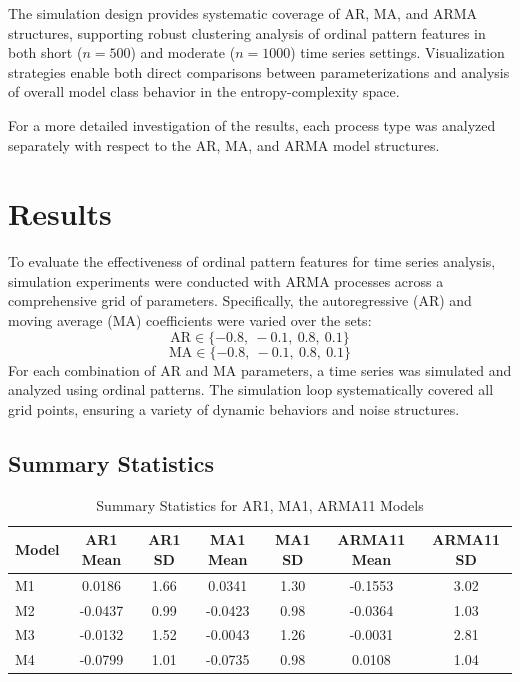 \documentclass[12pt,a4paper]{article}
\begin{document}
The simulation design provides systematic coverage of AR, MA, and ARMA structures, supporting robust clustering analysis of ordinal pattern features in both short ($n=500$) and moderate ($n=1000$) time series settings. Visualization strategies enable both direct comparisons between parameterizations and analysis of overall model class behavior in the entropy-complexity space.

For a more detailed investigation of the results, each process type was analyzed separately with respect to the AR, MA, and ARMA model structures.


\section{Results}

To evaluate the effectiveness of ordinal pattern features for time series analysis, simulation experiments were conducted with ARMA processes across a comprehensive grid of parameters. Specifically, the autoregressive (AR) and moving average (MA) coefficients were varied over the sets:
\[
\text{AR} \in \{-0.8,\ -0.1,\ 0.8,\ 0.1 \}
\]
\[
\text{MA} \in \{-0.8,\ -0.1,\ 0.8,\ 0.1 \}
\]
For each combination of AR and MA parameters, a time series was simulated and analyzed using ordinal patterns. The simulation loop systematically covered all grid points, ensuring a variety of dynamic behaviors and noise structures.

\subsection{Summary Statistics}

\begin{table}[H]
	\centering
	\caption{Summary Statistics for AR1, MA1, ARMA11 Models}
	\begin{tabular}{lcccccc}
		\toprule
		Model & AR1 Mean & AR1 SD & MA1 Mean & MA1 SD & ARMA11 Mean & ARMA11 SD \\
		\midrule
		M1    & 0.0186   & 1.66   & 0.0341   & 1.30   & -0.1553     & 3.02      \\
		M2    & -0.0437  & 0.99   & -0.0423  & 0.98   & -0.0364     & 1.03      \\
		M3    & -0.0132  & 1.52   & -0.0043  & 1.26   & -0.0031     & 2.81      \\
		M4    & -0.0799  & 1.01   & -0.0735  & 0.98   & 0.0108      & 1.04      \\
		\bottomrule
	\end{tabular}
\end{table}
\end{document}
